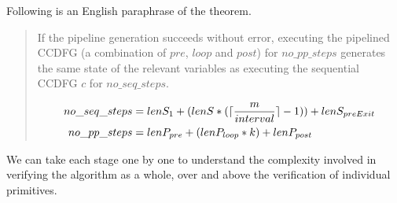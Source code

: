 Following is an English paraphrase of the theorem.
  
\begin{quote}  
If the pipeline generation succeeds without error,
executing the pipelined CCDFG (a combination of $pre$, $loop$ and $post$) for $no\_pp\_steps$
generates the same state of the relevant variables as executing the sequential CCDFG $c$ for $no\_seq\_steps$.

\small
\begin{equation}
\begin{split}
no\_seq\_steps &= len S_{1} + (len S * (\lceil\frac{m}{interval}\rceil - 1)) + len S_{preExit} \\
no\_pp\_steps &= len P_{pre} + (len P_{loop} * k) + len P_{post}
\end{split}
\end{equation}


\normalsize

\end{quote}

We can take each stage one by one to understand the complexity involved in 
verifying the algorithm as a whole, over and above the verification of 
individual primitives.

